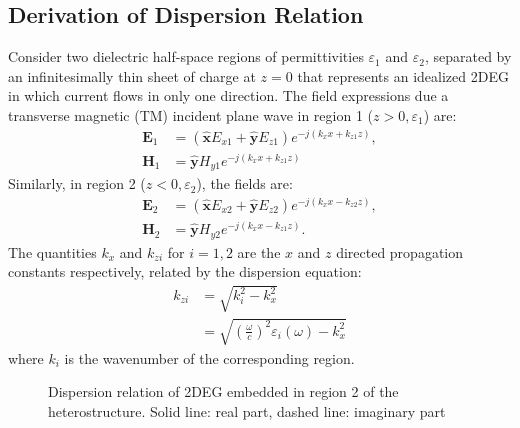 \documentclass[conference, 10pt]{IEEEtran}
\renewcommand{\v}[1]{\mathbf{#1}} %
\renewcommand{\O}{\omega}  %
\newcommand{\E}{\varepsilon}  %
\renewcommand{\^}{\hat}  %
\begin{document}
\subsection{Derivation of Dispersion Relation}
%
Consider two dielectric half-space regions of permittivities $\E_1$ and $\E_2$, separated by an infinitesimally thin sheet of charge at $z = 0$ that represents an idealized 2DEG in which current flows in only one direction. The field expressions due a transverse magnetic (TM) incident plane wave in region 1 ($z > 0, \E_1$) are:
%
\begin{subequations}
  \begin{align}
    \v E_1 &=  \left(\v{\^{x}} E_{x1} + \v{\^{y}} E_{z1} \right) e^{-j (k_x x + k_{z1}z)},
    \label{eq:E_1}\\
    \v H_1 &=  \v{\^{y}} H_{y1} e^{-j (k_x x + k_{z1}z)}
    \label{eq:H_1}
  \end{align}
  \label{eq:r_1}
\end{subequations}
%
Similarly, in region 2 ($z < 0, \E_2$), the fields are:
%
\begin{subequations}
  \begin{align}
    \v E_2 &=  \left(\v{\^{x}} E_{x2} + \v{\^{y}} E_{z2} \right) e^{-j (k_x x - k_{z2}z)},
    \label{eq:E_2}\\
    \v H_2 &=  \v{\^{y}} H_{y2} e^{-j (k_x x - k_{z1}z)}.
    \label{eq:H_2}
  \end{align}
  \label{eq:r_2}
\end{subequations}
%
The quantities $k_x$ and $k_{zi}$ for $i = 1,2$ are the $x$ and $z$ directed propagation constants respectively, related by the dispersion equation:
%
\begin{equation}
  \begin{split}
    k_{zi} & = \sqrt{k_i^2 - k_x^2} \\
    & = \sqrt{\left(\frac{\O}{c}\right)^2 \E_i(\O) -  k_x^2}
  \end{split}
  \label{eq:kz}
\end{equation}
%
where $k_i$ is the wavenumber of the corresponding region.
%
\begin{figure*}[!t]
  \centering
  \subfloat[Case A]{
  \label{fig:disp_Ga}}
  \hfil
  \subfloat[Case B]{
  \label{fig:disp_Sto}}
  \caption{Dispersion relation of 2DEG embedded in region 2 of the heterostructure. Solid line: real part, dashed line: imaginary part}
  \label{fig:disp}
\end{figure*}
\end{document}
